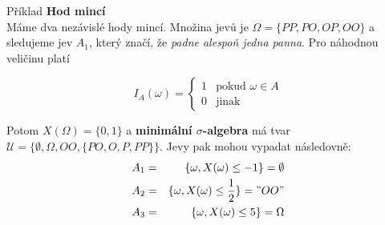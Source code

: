 \begin{note}{Příklad}
\textbf{Hod mincí}\\
Máme dva nezávislé hody mincí. Množina jevů je $\Omega=\{PP,PO,OP,OO\}$ a sledujeme jev $A_1$, který značí, že \textit{padne alespoň jedna panna}. Pro náhodnou veličinu platí

\[
I_A(\omega) =
\begin{cases}
	1 & \text{pokud } \omega\in A\\
	0 & \text{jinak}
\end{cases}
\]

Potom $X(\Omega)=\{0,1\}$ a \textbf{minimální $\sigma$-algebra} má tvar $\mathscr{U}=\big\{\emptyset, \Omega, OO, \{PO,O,P,PP\}\big\}$. Jevy pak mohou vypadat následovně:
\begin{eqnarray*}
A_1 & = & \{\omega, X(\omega)\leq -1\}=\emptyset\\
A_2 & = & \{\omega, X(\omega)\leq \frac{1}{2}\}="OO"\\
A_3 & = & \{\omega, X(\omega)\leq 5\}=\Omega
\end{eqnarray*}
\end{note}